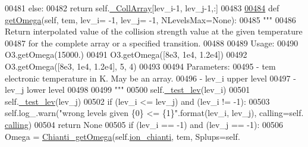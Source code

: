 \begin{DoxyCode}
00481         \textcolor{keywordflow}{else}:
00482             \textcolor{keywordflow}{return} self.\hyperlink{classpyneb_1_1utils_1_1pn__chianti_1_1___coll_chianti_a5cdf912f3bcbf25bcbbba1ba8fc072d9}{\_CollArray}[lev\_i-1, lev\_j-1,:]
00483 
\hypertarget{pn__chianti_8py_source_l00484}{}\hyperlink{classpyneb_1_1utils_1_1pn__chianti_1_1___coll_chianti_a8dd1bccc8974d0b3a44f03658e993b08}{00484}     \textcolor{keyword}{def }\hyperlink{classpyneb_1_1utils_1_1pn__chianti_1_1___coll_chianti_a8dd1bccc8974d0b3a44f03658e993b08}{getOmega}(self, tem, lev\_i= -1, lev\_j= -1, NLevelsMax=None):
00485         \textcolor{stringliteral}{"""}
00486 \textcolor{stringliteral}{        Return interpolated value of the collision strength value at the given temperature }
00487 \textcolor{stringliteral}{            for the complete array or a specified transition.}
00488 \textcolor{stringliteral}{}
00489 \textcolor{stringliteral}{        Usage:}
00490 \textcolor{stringliteral}{            O3.getOmega(15000.)}
00491 \textcolor{stringliteral}{            O3.getOmega([8e3, 1e4, 1.2e4])}
00492 \textcolor{stringliteral}{            O3.getOmega([8e3, 1e4, 1.2e4], 5, 4)}
00493 \textcolor{stringliteral}{        }
00494 \textcolor{stringliteral}{        Parameters:}
00495 \textcolor{stringliteral}{            - tem    electronic temperature in K. May be an array.}
00496 \textcolor{stringliteral}{            - lev\_i  upper level}
00497 \textcolor{stringliteral}{            - lev\_j  lower level}
00498 \textcolor{stringliteral}{}
00499 \textcolor{stringliteral}{        """}
00500         self.\hyperlink{classpyneb_1_1utils_1_1pn__chianti_1_1___coll_chianti_ab0418def377c8054aded2bfb3055a40f}{\_test\_lev}(lev\_i)
00501         self.\hyperlink{classpyneb_1_1utils_1_1pn__chianti_1_1___coll_chianti_ab0418def377c8054aded2bfb3055a40f}{\_test\_lev}(lev\_j)
00502         \textcolor{keywordflow}{if} (lev\_i <= lev\_j) \textcolor{keywordflow}{and} (lev\_i != -1):
00503             self.log\_.warn(\textcolor{stringliteral}{"wrong levels given \{0\} <= \{1\}"}.format(lev\_i, lev\_j), calling=self.
      \hyperlink{classpyneb_1_1utils_1_1pn__chianti_1_1___coll_chianti_ab58a9cfcb76b7c72b9b815c5700e7aae}{calling})
00504             \textcolor{keywordflow}{return} \textcolor{keywordtype}{None}            
00505         \textcolor{keywordflow}{if} (lev\_i == -1) \textcolor{keywordflow}{and} (lev\_j == -1):
00506             Omega = \hyperlink{namespacepyneb_1_1utils_1_1pn__chianti_a651b939729d0f5afb817a47a974bfaa1}{Chianti\_getOmega}(self.\hyperlink{classpyneb_1_1utils_1_1pn__chianti_1_1___coll_chianti_af0f28fb84d1ceb9d64e40429c981a6f6}{ion\_chianti}, tem, Splups=self.

\end{DoxyCode}
